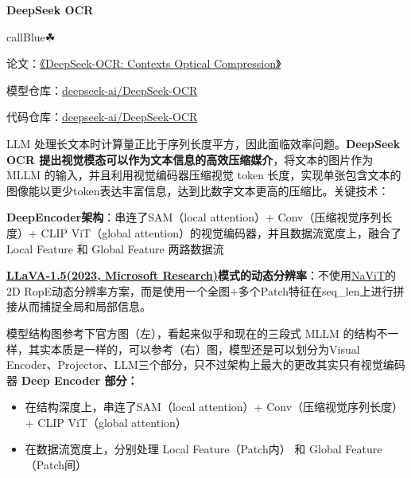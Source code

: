 \documentclass[zihao=false,fontset=windows]{ctexart}
\newcommand{\incode}[1]{\colorbox{inlinebg}{\ttfamily\small #1}}
\newcommand{\feihone}[2]{\par\vspace{1.15em}\Needspace{4\baselineskip}\noindent{\zihao{-2}\bfseries\textcolor{feishuBlue}{#1}\hspace{0.35em}#2}\par\vspace{0.28em}}
\begin{document}
{\bfseries DeepSeek OCR\par}
\begin{feishubox}{callBlue}{☘}


论文：\href{https://github.com/deepseek-ai/DeepSeek-OCR/blob/main/DeepSeek_OCR_paper.pdf}{《DeepSeek-OCR: Contexts Optical Compression》}\par

模型仓库：\href{https://huggingface.co/deepseek-ai/DeepSeek-OCR}{deepseek-ai/DeepSeek-OCR}\par

代码仓库：\href{https://github.com/deepseek-ai}{deepseek-ai/DeepSeek-OCR}\par

\end{feishubox}

LLM 处理长文本时计算量正比于序列长度平方，因此面临效率问题。\textcolor{feishuRed}{\textbf{DeepSeek OCR 提出视觉模态可以作为文本信息的高效压缩媒介}}，将文本的图片作为 MLLM 的输入，并且利用视觉编码器压缩视觉 token 长度，实现单张包含文本的图像能以更少token表达丰富信息，达到比数字文本更高的压缩比。关键技术：\par

\textbf{DeepEncoder架构}：串连了SAM（local attention）+ Conv（压缩视觉序列长度）+ CLIP ViT（global attention）的视觉编码器，并且数据流宽度上，融合了 Local Feature 和 Global Feature 两路数据流\par

\textbf{\href{https://scnajei2ds6y.feishu.cn/wiki/HTJVw44IJibX6gkYWtlc1zCYnVh}{LLaVA-1.5(2023, Microsoft Research)}}\textbf{模式的动态分辨率}：不使用\href{https://scnajei2ds6y.feishu.cn/wiki/N6PmwVkCcisDJGkC7Ypc1SfInwh}{NaViT}的2D RopE动态分辨率方案，而是使用一个全图+多个Patch特征在\incode{seq\_len}上进行拼接从而捕捉全局和局部信息。\par

\feihone{1.}{模型架构}

模型结构图参考下官方图（左），看起来似乎和现在的三段式 MLLM 的结构不一样，其实本质是一样的，可以参考（右）图，模型还是可以划分为Visual Encoder、Projector、LLM三个部分，\textcolor{feishuRed}{只不过架构上最大的更改其实只有视觉编码器 }\textcolor{feishuRed}{\textbf{Deep Encoder 部分}}\textbf{：}\par

\begin{itemize}

\item 在结构深度上，串连了SAM（local attention）+ Conv（压缩视觉序列长度）+ CLIP ViT（global attention）

\item 在数据流宽度上，分别处理 Local Feature（Patch内） 和 Global Feature（Patch间）

\end{itemize}
\end{document}
